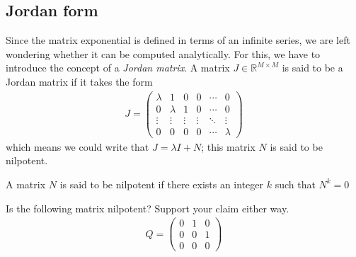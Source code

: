 \documentclass[a4paper,11pt]{exam}
\newcounter{ct}
\newcommand{\field}[1]{\ensuremath{\mathbb{#1}}}
\newcommand{\reals}{\field{R}}
\begin{document}
\begin{questions}
\subsection{Jordan form}
Since the matrix exponential is defined in terms of an infinite series, we are left wondering whether it can be computed analytically.  For this, we have to introduce the concept of a \textit{Jordan matrix}.  A matrix $J \in \reals^{M\times M}$ is said to be a Jordan matrix if it takes the form
\begin{align}
    J = \begin{pmatrix} \lambda & 1 & 0 & 0 & \cdots & 0\\
        0 & \lambda & 1 & 0 & \cdots & 0\\
        \vdots & \vdots & \vdots & \vdots & \ddots & \vdots\\
        0 & 0 & 0 & 0 & \cdots & \lambda
    \end{pmatrix}
\end{align}
which means we could write that $J = \lambda I + N$; this matrix $N$ is said to be nilpotent. 

\begin{tcolorbox}[colback=black!1!,title=Nilpotent matrices]
    A matrix $N$ is said to be nilpotent if there exists an integer $k$ such that $N^k = 0$
\end{tcolorbox}

\question Is the following matrix nilpotent? Support your claim either way.
\begin{align}
    Q = \begin{pmatrix} 0 & 1 & 0\\
    0 & 0 & 1\\
    0 & 0 & 0
\end{pmatrix}
\end{align}



\end{questions}
\end{document}

